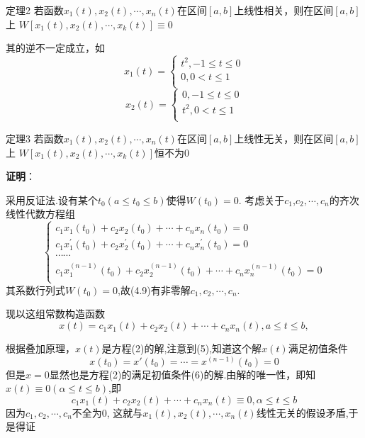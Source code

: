 \documentclass[aspectratio=169, 10pt, utf8, mathserif]{beamer}
\begin{document}
	\begin{frame}
		\begin{block}{定理2}
			若函数$x_1(t),x_2(t),\cdots,x_n(t)$在区间$[a,b]$上线性相关，则在区间$[a,b]$上	$W[x_1(t),x_2(t),\cdots ,x_k(t)]\equiv0$
		\end{block}
	其的逆不一定成立，如
	\begin{equation*}
		x_1\left( t \right) =\begin{cases}
			t^2,-1\le t\le 0\\
			0,0<t\le 1\\
		\end{cases}
	\end{equation*}
	\begin{equation*}
		x_2\left( t \right) =\begin{cases}
			0,-1\le t\le 0\\
			t^2,0<t\le 1\\
		\end{cases}
	\end{equation*}
	\end{frame}
	\begin{frame}
		\begin{block}{定理3}
			若函数$x_1(t),x_2(t),\cdots,x_n(t)$在区间$[a,b]$上线性无关，则在区间$[a,b]$上	$W[x_1(t),x_2(t),\cdots ,x_k(t)]$恒不为0
		\end{block}
	\textbf{证明}：
	
	采用反证法.设有某$个t_{0}$$(a\leq t_0\leq b)$使得$W(t_0)=0.$ 考虑关于$c_1$,$c_2,\cdots,c_n$的齐次线性代数方程组
	\begin{equation}
		\begin{cases}
			c_1x_1(t_0)+c_2x_2(t_0)+\cdots +c_nx_n(t_0)=0\\
			c_1x_{1}^{\prime}(t_0)+c_2x_{2}^{\prime}(t_0)+\cdots +c_nx_{n}^{\prime}(t_0)=0\\
			\cdots \cdots\\
			c_1x_{1}^{(n-1)}(t_0)+c_2x_{2}^{(n-1)}(t_0)+\cdots +c_nx_{n}^{(n-1)}(t_0)=0\\
		\end{cases}
	\end{equation}
	其系数行列式$W(t_0)=0$,故(4.9)有非零解$c_1,c_2,\cdots,c_n.$
	\end{frame}
	\begin{frame}
		现以这组常数构造函数
		\begin{equation*}
			x(t)=c_1x_1(t)+c_2x_2(t)+\cdots+c_nx_n(t),a\leq t\leq b,
		\end{equation*}
		
		根据叠加原理，$x(t)$是方程(2)的解,注意到(5),知道这个解$x(t)$满足初值条件
		\begin{equation}
			x(t_0)=x'(t_0)=\cdots=x^{(n-1)}(t_0)=0
		\end{equation}
		但是$x=0$显然也是方程(2)的满足初值条件(6)的解.由解的唯一性，即知$x(t)\equiv0(\alpha\leq t\leq b)$,即
		\begin{equation}
			c_1x_1(t)+c_2x_2(t)+\cdots+c_nx_n(t)\equiv0,\alpha\leq t\leq b
		\end{equation}
		因为$c_1,c_2,\cdots,c_n$不全为0,	这就与$x_1(t),x_2(t),\cdots,x_n(t)$线性无关的假设矛盾,于是得证
	\end{frame}
\end{document}
